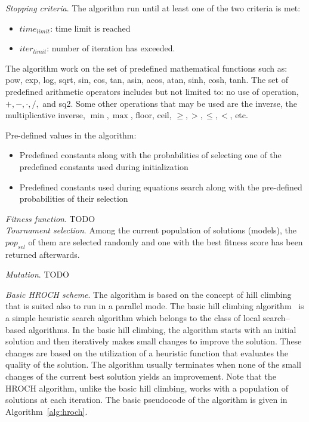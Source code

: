 \documentclass{bmcart}
\begin{document}
\textit{ Stopping criteria}. The algorithm run until at least one of the two criteria is met:
 \begin{itemize}
 	\item  $time_{limit}$: time limit is reached
 	\item $iter_{limit}$: number of iteration has exceeded.
 	
 \end{itemize}
 The algorithm work on the set of predefined mathematical functions such as: pow, exp, log, sqrt, sin, cos, tan, asin, acos, atan, sinh, cosh, tanh. 
 The set of predefined arithmetic operators includes but not limited to: no use of operation, $+, -, \cdot, /,$ and sq2. Some other operations that may be used are the inverse, the multiplicative inverse, $\min, \max$, floor, ceil, $\geq, >, \leq, <$, etc. 
 
 Pre-defined values in the algorithm:
 
 \begin{itemize}
 	\item Predefined constants along with the probabilities of selecting one of the predefined constants used during initialization 
 	\item Predefined constants used during equations search along with the pre-defined probabilities of their selection
 \end{itemize}


\textit{Fitness function}. TODO \\

\textit{Tournament selection}.  Among the current population of solutions (models), the $pop_{sel}$ of them are selected randomly and one with the best fitness score has been returned afterwards. 

\textit{Mutation}. TODO

\textit{Basic HROCH scheme}. The algorithm is based on the concept of hill climbing that is suited also to run in a parallel mode. The basic hill climbing algorithm~\cite{ohashi2003hill} is  a simple heuristic search algorithm which belongs to the class of local search--based algorithms. In the basic hill climbing, the algorithm starts with an initial solution and then iteratively makes small changes to improve the solution.  These changes are based on the utilization of a heuristic function that evaluates the quality of the solution. The algorithm usually terminates when none of the small changes of the current best solution yields an improvement. Note that the HROCH algorithm, unlike the basic hill climbing, works with a population of solutions at each iteration. The basic pseudocode of the algorithm is given in Algorithm~\ref{alg:hroch}.
\end{document}
